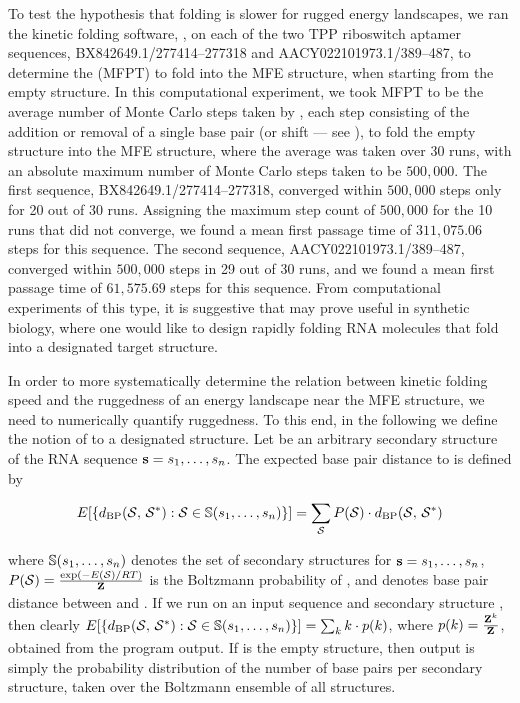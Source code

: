 To test the hypothesis that folding is slower for rugged energy landscapes,
we ran the kinetic folding software, \kinfold \cite{flamm},
on each of the two TPP riboswitch aptamer sequences,
BX842649.1/277414--277318 and AACY022101973.1/389--487,
to determine the \mfpt (MFPT) to
fold into the MFE structure, when starting from the empty structure.
In this computational
experiment, we took MFPT to be the average number of Monte Carlo steps
taken by \kinfold, each step consisting of the addition or removal
of a single base pair (or shift --- see \cite{flamm}), to fold the
empty structure into the MFE
structure, where the average was taken over 30 runs, with an absolute
maximum number of Monte Carlo steps taken to be $500,000$.
The first sequence, BX842649.1/277414--277318, converged within $500,000$
steps only for 20 out of 30 runs. Assigning the maximum step count of
$500,000$ for the 10 runs that did not converge, we found a mean first
passage time of $311,075.06$ steps for this sequence.
The second sequence, AACY022101973.1/389--487, converged within $500,000$
steps in 29 out of 30 runs, and we found a mean first passage time of
$61,575.69$ steps for this sequence. From computational experiments of this
type, it is suggestive that \fftbor may prove useful in synthetic
biology,
where one would like to design rapidly folding RNA molecules that
fold into a designated target structure.

In order to more systematically determine the relation between kinetic
folding speed and the ruggedness of an energy landscape near the MFE structure,
we need to numerically quantify ruggedness. To this end, in the following
we define the notion of \ebpd to a designated
structure. Let \strSt be an arbitrary secondary structure of the RNA sequence
${\bf s} = s_1,\dots,s_n$.
The expected base pair distance to \strSt is defined by

\begin{align}
E[ \{ d_{\text{BP}}(\mathcal S,\,\mathcal S^*) : \mathcal S \in \mathbb{S}(s_1,\dots,s_n)\} ] =
\sum_{\mathcal S} P(\mathcal S) \cdot d_{\text{BP}}(\mathcal S,\,\mathcal S^*)
\end{align}

where
$\mathbb{S}(s_1,\dots,s_n)$ denotes the set of secondary structures for
${\bf s} = s_1,\dots,s_n$, $P(\mathcal S) = \frac{\exp(-E(\mathcal S)/RT)}{{\bf Z}^{}_{}}$ is the Boltzmann
probability of \str, and
\dBP{\str}{\strSt} denotes base pair distance between \str and \strSt.
If we run \fftbor on an input sequence \seq and secondary structure
\strSt, then clearly
$E[ \{ d_{\text{BP}}(\mathcal S,\,\mathcal S^*) : \mathcal S \in \mathbb{S}(s_1,\dots,s_n)\} ] =
\sum_{k} k \cdot p(k)$, where $p(k)=\frac{{\bf Z}^{k}_{}}{{\bf Z}^{}_{}}$, obtained from the
program output.  If \strSt is the empty structure, then \fftbor output
is simply the probability distribution of the number of base pairs per
secondary structure, taken over the Boltzmann ensemble of all structures.

